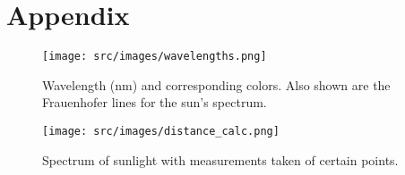 \section{Appendix}
        
    \begin{figure}[H]
        \centering
        \texttt{[image: src/images/wavelengths.png]}
        \caption{Wavelength (nm) and corresponding colors. Also shown are the Frauenhofer lines for the sun's spectrum.}
        \label{fig_wavelengths}
    \end{figure}

    \begin{figure}[H]
        \centering
        \texttt{[image: src/images/distance\_calc.png]}
        \caption{Spectrum of sunlight with measurements taken of certain points.}
        \label{fig_distance_calc}
    \end{figure}